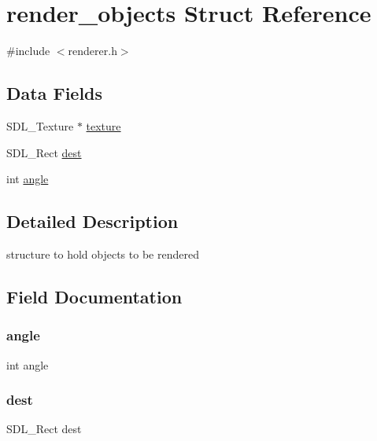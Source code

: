 \hypertarget{structrender__objects}{}\section{render\+\_\+objects Struct Reference}
\label{structrender__objects}


{\ttfamily \#include $<$renderer.\+h$>$}

\subsection*{Data Fields}
\begin{DoxyCompactItemize}
\item 
S\+D\+L\+\_\+\+Texture $\ast$ \mbox{\hyperlink{structrender__objects_a859b8efbf9abe8e82757ee5c75a0c97c}{texture}}
\item 
S\+D\+L\+\_\+\+Rect \mbox{\hyperlink{structrender__objects_a1d4c1bb15892e31b9af1f4fcf5d31fab}{dest}}
\item 
int \mbox{\hyperlink{structrender__objects_a63177970cacb40efba67ce501ea89210}{angle}}
\end{DoxyCompactItemize}


\subsection{Detailed Description}
structure to hold objects to be rendered 

\subsection{Field Documentation}
\mbox{\label{structrender__objects_a63177970cacb40efba67ce501ea89210}} 
\subsubsection{\texorpdfstring{angle}{angle}}
{\footnotesize\ttfamily int angle}

\mbox{\label{structrender__objects_a1d4c1bb15892e31b9af1f4fcf5d31fab}} 
\subsubsection{\texorpdfstring{dest}{dest}}
{\footnotesize\ttfamily S\+D\+L\+\_\+\+Rect dest}

